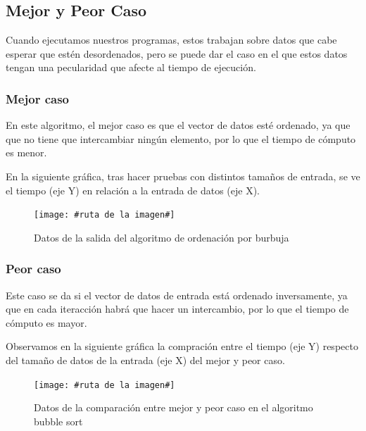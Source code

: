 \subsection{Mejor y Peor Caso}

Cuando ejecutamos nuestros programas, estos trabajan sobre datos que cabe esperar que estén desordenados, pero se puede dar el caso en el que estos datos tengan una pecularidad que afecte al tiempo de ejecución.

\subsubsection{Mejor caso}

En este algoritmo, el mejor caso es que el vector de datos esté ordenado, ya que que no tiene que intercambiar ningún elemento, por lo que el tiempo de cómputo es menor.

En la siguiente gráfica, tras hacer pruebas con distintos tamaños de entrada, se ve el tiempo (eje Y) en relación a la entrada de datos (eje X).

\begin{figure}[ht]
  \centery
  \texttt{[image: \#ruta de la imagen\#]}
  \caption{Datos de la salida del algoritmo de ordenación por burbuja}
\end{figure}

\subsubsection{Peor caso}

Este caso se da si el vector de datos de entrada está ordenado inversamente, ya que en cada iteracción habrá que hacer un intercambio, por lo que el tiempo de cómputo es mayor.

Observamos en la siguiente gráfica la compración entre el tiempo (eje Y) respecto del tamaño de datos de la entrada (eje X) del mejor y peor caso.

\begin{figure}[ht]
  \centery
  \texttt{[image: \#ruta de la imagen\#]}
  \caption{Datos de la comparación entre mejor y peor caso en el algoritmo bubble sort}
\end{figure}
